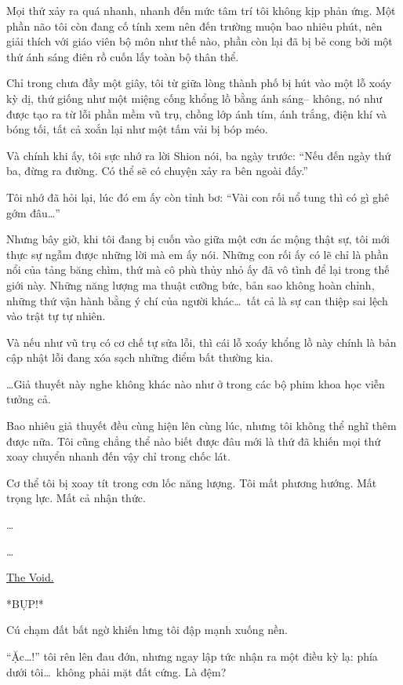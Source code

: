 \documentclass[../main.tex]{subfiles}
\begin{document}
Mọi thứ xảy ra quá nhanh, nhanh đến mức tâm trí tôi không kịp phản ứng. Một phần não tôi còn đang cố tính xem nên đến trường muộn bao nhiêu phút, nên giải thích với giáo viên bộ môn như thế nào, phần còn lại đã bị bẻ cong bởi một thứ ánh sáng điên rồ cuốn lấy toàn bộ thân thể.

Chỉ trong chưa đầy một giây, tôi từ giữa lòng thành phố bị hút vào một lỗ xoáy kỳ dị, thứ giống như một miệng cống khổng lồ bằng ánh sáng-- không, nó như được tạo ra từ lỗi phần mềm vũ trụ, chồng lớp ánh tím, ánh trắng, điện khí và bóng tối, tất cả xoắn lại như một tấm vải bị bóp méo.

Và chính khi ấy, tôi sực nhớ ra lời Shion nói, ba ngày trước: ``Nếu đến ngày thứ ba, đừng ra đường. Có thể sẽ có chuyện xảy ra bên ngoài đấy.''

Tôi nhớ đã hỏi lại, lúc đó em ấy còn tỉnh bơ: ``Vài con rối nổ tung thì có gì ghê gớm đâu\dots''

Nhưng bây giờ, khi tôi đang bị cuốn vào giữa một cơn ác mộng thật sự, tôi mới thực sự ngẫm được những lời mà em ấy nói. Những con rối ấy có lẽ chỉ là phần nổi của tảng băng chìm, thứ mà cô phù thủy nhỏ ấy đã vô tình để lại trong thế giới này. Những năng lượng ma thuật cưỡng bức, bản sao không hoàn chỉnh, những thứ vận hành bằng ý chí của người khác\dots\  tất cả là sự can thiệp sai lệch vào trật tự tự nhiên.

Và nếu như vũ trụ có cơ chế tự sửa lỗi, thì cái lỗ xoáy khổng lồ này chính là bản cập nhật lỗi đang xóa sạch những điểm bất thường kia.

\dots Giả thuyết này nghe không khác nào như ở trong các bộ phim khoa học viễn tưởng cả.

Bao nhiêu giả thuyết đều cùng hiện lên cùng lúc, nhưng tôi không thể nghĩ thêm được nữa. Tôi cũng chẳng thể nào biết được đâu mới là thứ đã khiến mọi thứ xoay chuyển nhanh đến vậy chỉ trong chốc lát.

Cơ thể tôi bị xoay tít trong cơn lốc năng lượng. Tôi mất phương hướng. Mất trọng lực. Mất cả nhận thức.

\dots

\dots

\begin{center}
    \uline{The Void.}
\end{center}

*BỤP!*

Cú chạm đất bất ngờ khiến lưng tôi đập mạnh xuống nền.

``Ặc\dots!'' tôi rên lên đau đớn, nhưng ngay lập tức nhận ra một điều kỳ lạ: phía dưới tôi\dots\ không phải mặt đất cứng. Là đệm?
\end{document}
